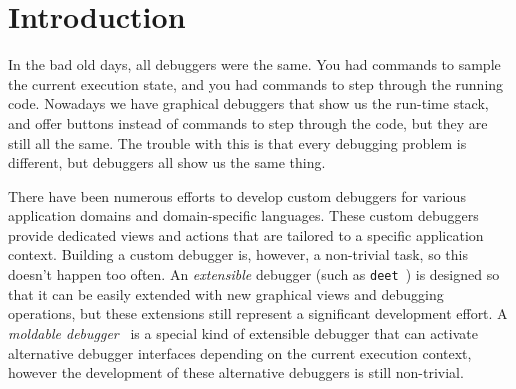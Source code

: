 \documentclass[sigplan,anonymous,review,10pt]{acmart}
\newcommand\ac[1]{\nbc{AC}{#1}{teal}}
\newcommand\deet{{\tt deet}\xspace}
\begin{document}
\maketitle

\section{Introduction}\label{sec:intro}

In the bad old days, all debuggers were the same.
You had commands to sample the current execution state, and you had commands to step through the running code.
Nowadays we have graphical debuggers that show us the run-time stack, and offer buttons instead of commands to step through the code, but they are still all the same.
The trouble with this is that every debugging problem is different, but debuggers all show us the same thing.

There have been numerous efforts to develop custom debuggers for various application domains and domain-specific languages.
These custom debuggers provide dedicated views and actions that are tailored to a specific application context.
Building a custom debugger is, however, a non-trivial task, so this doesn't happen too often.
An \emph{extensible} debugger (such as \deet~\cite{Hans97a}) is designed so that it can be easily extended with new graphical views and debugging operations, but these extensions still represent a significant development effort.
A \emph{moldable debugger}~\cite{Chis15c} is a special kind of extensible debugger that can activate alternative debugger interfaces depending on the current execution context, however the development of these alternative debuggers is still non-trivial.

\end{document}
